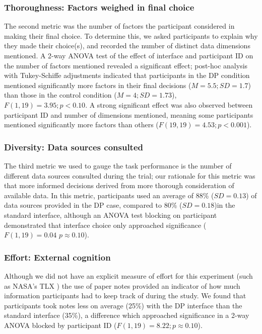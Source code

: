 \documentclass{sigchi}
\begin{document}
\subsubsection{Thoroughness: Factors weighed in final choice}
The second metric was the number of factors the participant considered in making their final choice. To determine this, we asked participants to explain why they made their choice(s), and recorded the number of distinct data dimensions mentioned.  A 2-way ANOVA test of the effect of interface and participant ID on the number of factors mentioned revealed a significant effect; post-hoc analysis with Tukey-Schiffe adjustments indicated that participants in the DP condition mentioned significantly more factors in their final decisions ($M=5.5; SD=1.7$) than those in the control condition ($M=4; SD=1.73$), $F(1,19)=3.95; p<0.10$. A strong significant effect was also observed between participant ID and number of dimensions mentioned, meaning some participants mentioned significantly more factors than others ($F(19,19)=4.53; p < 0.001$).

\subsubsection{Diversity: Data sources consulted}
The third metric we used to gauge the task performance is the number of different data sources consulted during the trial; our rationale for this metric was that more informed decisions derived from more thorough consideration of available data. In this metric, participants used an average of 88\% ($SD=0.13$) of data sources provided in the DP case, compared to 80\% ($SD=0.18$)in the standard interface, although an ANOVA test blocking on participant demonstrated that interface choice only approached significance ($F(1,19)=0.04$ $p\approx0.10$).

\subsubsection{Effort: External cognition}
Although we did not have an explicit measure of effort for this experiment (such as NASA's TLX \cite{tlx}) the use of paper notes provided an indicator of how much information participants had to keep track of during the study.  We found that participants took notes less on average (25\%) with the DP interface than the standard interface (35\%), a difference which approached significance in a 2-way ANOVA blocked by participant ID ($F(1,19)= 8.22; p\approx0.10$).
\end{document}

